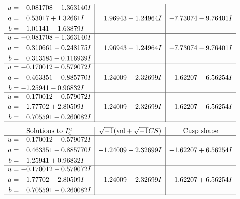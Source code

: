 \documentclass[1p]{elsarticle_modified}
\theoremstyle{definition}
\newcommand{\I}{\sqrt{-1}}
\begin{document}
$$\begin{array}{c|c|c}
\begin{aligned}
u &= -0.081708 - 1.363140 I \\
a &= \phantom{-}0.53017 + 1.32661 I \\
b &= -1.01141 - 1.63879 I\end{aligned}
 & \phantom{-}1.96943 + 1.24964 I & -7.73074 - 9.76401 I \\ \hline\begin{aligned}
u &= -0.081708 - 1.363140 I \\
a &= \phantom{-}0.310661 - 0.248175 I \\
b &= \phantom{-}0.313585 + 0.116939 I\end{aligned}
 & \phantom{-}1.96943 + 1.24964 I & -7.73074 - 9.76401 I \\ \hline\begin{aligned}
u &= -0.170012 + 0.579072 I \\
a &= \phantom{-}0.463351 - 0.885770 I \\
b &= -1.25941 - 0.96832 I\end{aligned}
 & -1.24009 + 2.32699 I & -1.62207 - 6.56254 I \\ \hline\begin{aligned}
u &= -0.170012 + 0.579072 I \\
a &= -1.77702 + 2.80509 I \\
b &= \phantom{-}0.705591 + 0.260082 I\end{aligned}
 & -1.24009 + 2.32699 I & -1.62207 - 6.56254 I\\
 \hline 
 \end{array}$$\newpage$$\begin{array}{c|c|c}  
\text{Solutions to }I^u_{4}& \I (\text{vol} + \sqrt{-1}CS) & \text{Cusp shape}\\
 \hline 
\begin{aligned}
u &= -0.170012 - 0.579072 I \\
a &= \phantom{-}0.463351 + 0.885770 I \\
b &= -1.25941 + 0.96832 I\end{aligned}
 & -1.24009 - 2.32699 I & -1.62207 + 6.56254 I \\ \hline\begin{aligned}
u &= -0.170012 - 0.579072 I \\
a &= -1.77702 - 2.80509 I \\
b &= \phantom{-}0.705591 - 0.260082 I\end{aligned}
 & -1.24009 - 2.32699 I & -1.62207 + 6.56254 I\\
 \hline 
 \end{array}$$\newpage
\newpage\renewcommand{\arraystretch}{1}
\end{document}
